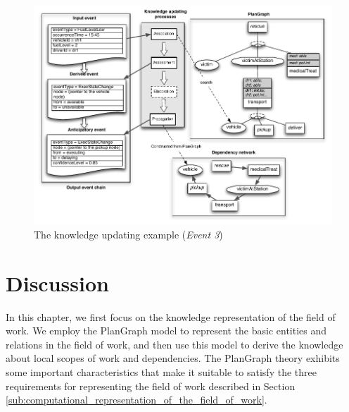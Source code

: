 \begin{figure}[htbp] %
	\centering
	\includegraphics{update_example_event3.pdf} 
	\caption{The knowledge updating example (\emph{Event 3})}
	\label{fig:update_example_event3}
\end{figure}

\section{Discussion} %
\label{sec:knowledge_representation_discussion}
In this chapter, we first focus on the knowledge representation of the field of work. We employ the PlanGraph model to represent the basic entities and relations in the field of work, and then use this model to derive the knowledge about local scopes of work and dependencies. The PlanGraph theory exhibits some important characteristics that make it suitable to satisfy the three requirements for representing the field of work described in Section \ref{sub:computational_representation_of_the_field_of_work}.

